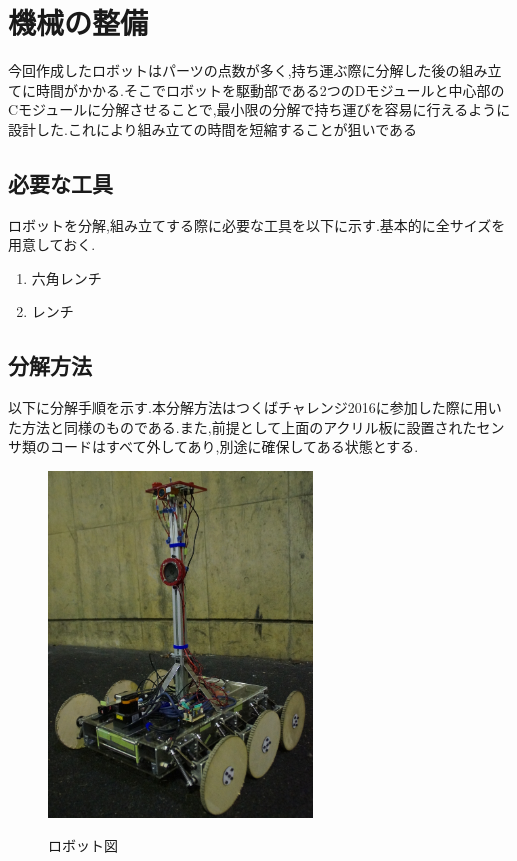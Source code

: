 \section{機械の整備}
今回作成したロボットはパーツの点数が多く,持ち運ぶ際に分解した後の組み立てに時間がかかる.そこでロボットを駆動部である2つのDモジュールと中心部のCモジュールに分解させることで,最小限の分解で持ち運びを容易に行えるように設計した.これにより組み立ての時間を短縮することが狙いである
\subsection{必要な工具}
ロボットを分解,組み立てする際に必要な工具を以下に示す.基本的に全サイズを用意しておく.
\begin{enumerate}
 \item 六角レンチ
 \item レンチ
\end{enumerate}

\subsection{分解方法}
以下に分解手順を示す.本分解方法はつくばチャレンジ2016に参加した際に用いた方法と同様のものである.また,前提として上面のアクリル板に設置されたセンサ類のコードはすべて外してあり,別途に確保してある状態とする.
\begin{figure}[htp]
 \begin{center}
  \includegraphics[width=70mm]{img/hard/zentai.jpg}
 　\caption{ロボット図}
  \label{fig:robot}%
 \end{center}
\end{figure}

